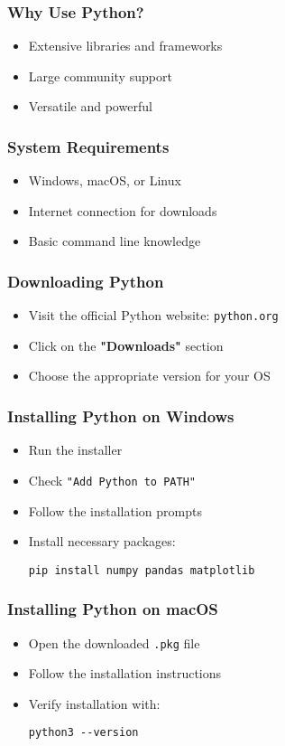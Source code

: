 \documentclass{beamer}
\begin{document}
\begin{frame}
    \frametitle{Why Use Python?}
    \begin{itemize}
        \item Extensive libraries and frameworks
        \item Large community support
        \item Versatile and powerful
    \end{itemize}
\end{frame}

\begin{frame}
    \frametitle{System Requirements}
    \begin{itemize}
        \item Windows, macOS, or Linux
        \item Internet connection for downloads
        \item Basic command line knowledge
    \end{itemize}
\end{frame}

\begin{frame}
    \frametitle{Downloading Python}
    \begin{itemize}
        \item Visit the official Python website: \texttt{python.org}
        \item Click on the \textbf{"Downloads"} section
        \item Choose the appropriate version for your OS
    \end{itemize}
\end{frame}

\begin{frame}
    \frametitle{Installing Python on Windows}
    \begin{itemize}
        \item Run the installer
        \item Check \texttt{"Add Python to PATH"}
        \item Follow the installation prompts
        \item Install necessary packages:
        \begin{tcolorbox}[colback=lightblue, colframe=darkblue, title=Install Packages]
            \lstinline|pip install numpy pandas matplotlib|
        \end{tcolorbox}
    \end{itemize}
\end{frame}

\begin{frame}
    \frametitle{Installing Python on macOS}
    \begin{itemize}
        \item Open the downloaded \texttt{.pkg} file
        \item Follow the installation instructions
        \item Verify installation with:
        \begin{tcolorbox}[colback=lightblue, colframe=darkblue, title=Verify Installation]
            \lstinline|python3 --version|
        \end{tcolorbox}
    \end{itemize}
\end{frame}
\end{document}
